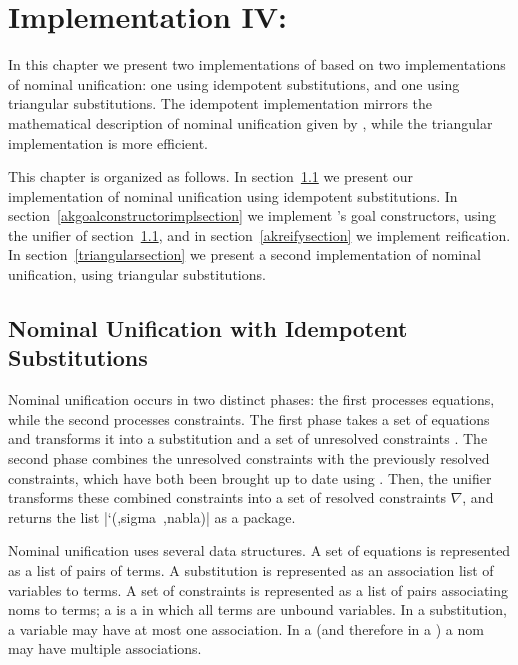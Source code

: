 \chapter{Implementation IV:  \alphakanren}\label{akimplchapter}

\enlargethispage{1em}

In this chapter we present two implementations of \alphakanrensp based
on two implementations of nominal unification: one using idempotent
substitutions, and one using triangular substitutions.  The idempotent
implementation mirrors the mathematical description of nominal
unification given by \citet{Urban-Pitts-Gabbay/04}, while the
triangular implementation is more efficient.

This chapter is organized as follows. In section~\ref{nominalunif} we
present our implementation of nominal unification using idempotent
substitutions. In section~\ref{akgoalconstructorimplsection} we
implement \alphakanren's goal constructors, using the unifier of
section~\ref{nominalunif}, and in section~\ref{akreifysection} we
implement reification.  In section~\ref{triangularsection} we present
a second implementation of nominal unification, using triangular
substitutions.  


\section{Nominal Unification with Idempotent Substitutions}\label{nominalunif}

Nominal unification occurs in two distinct phases: the first processes
equations, while the second processes constraints.  The first phase
takes a set of equations  and transforms it into a
substitution  and a set of unresolved constraints
.  The second phase combines the unresolved constraints
with the previously resolved constraints, which have both been brought
up to date using .  Then, the unifier transforms
these combined constraints into a set of resolved constraints
$\nabla$, and returns the list \mbox{\scheme|`(,sigma ,nabla)|} as a
package.

Nominal unification uses several data structures.  A set of
equations  is represented as a list of pairs of terms.
A substitution  is represented as an association list of variables to terms.
A set of constraints  is represented as a list of pairs associating
noms to terms; a  is a  in which all terms are unbound variables.
In a substitution, a variable may have at most one association.  
In a  (and therefore in a ) a nom may have multiple associations.

